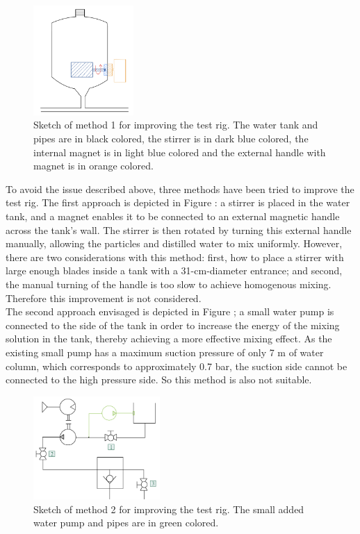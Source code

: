 \begin{figure}[htbp]
    \centering
    \includegraphics[width=0.34\textwidth]{figures/TestRig/Update1.jpg}
    \caption{Sketch of method 1 for improving the test rig. The water tank and pipes are in black colored,
     the stirrer is in dark blue colored, the internal magnet is in light blue colored and the external handle
      with magnet is in orange colored.}
    \label{fig:Update1}
\end{figure}



To avoid the issue described above, three methods have been tried to improve the test rig. The first 
approach is depicted in  Figure : a stirrer is placed in the water tank, and a magnet enables it to
be connected to an external magnetic handle across the tank's wall. The stirrer is then rotated by 
turning this external handle manually, allowing the particles and distilled water to mix uniformly.
However, there are two considerations with this method: first, how to place a stirrer with large 
enough blades inside a tank with a 31-cm-diameter entrance; and second, the manual turning of the 
handle is too slow to achieve homogenous mixing. Therefore this improvement is not considered.\\


The second approach envisaged is depicted in Figure ; a small water pump is connected to the side of 
the tank in order to increase the energy of the mixing solution in the tank, thereby achieving a more
effective mixing effect. As the existing small pump has a maximum suction pressure of only 7 m of water 
column, which corresponds to approximately 0.7 bar, the suction side cannot be connected to the high 
pressure side. So this method is also not suitable.\\

\begin{figure}[htbp]
    \centering
    \includegraphics[width=0.43\textwidth]{figures/TestRig/Update2.jpg}
    \caption{Sketch of method 2 for improving the test rig. The small added water pump and pipes are in 
    green colored.}
    \label{fig:Update2}
\end{figure}


